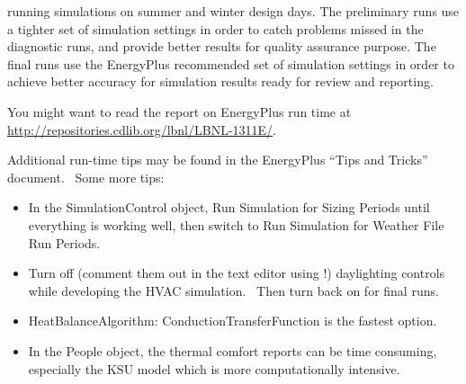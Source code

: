 running simulations on summer and winter design days. The preliminary runs use a tighter set of simulation settings in order to catch problems missed in the diagnostic runs, and provide better results for quality assurance purpose. The final runs use the EnergyPlus recommended set of simulation settings in order to achieve better accuracy for simulation results ready for review and reporting.

You might want to read the report on EnergyPlus run time at \url{http://repositories.cdlib.org/lbnl/LBNL-1311E/}.

Additional run-time tips may be found in the EnergyPlus ``Tips and Tricks'' document.~ Some more tips:

\begin{itemize}
\item
  In the SimulationControl object, Run Simulation for Sizing Periods until everything is working well, then switch to Run Simulation for Weather File Run Periods.
\item
  Turn off (comment them out in the text editor using !) daylighting controls while developing the HVAC simulation.~ Then turn back on for final runs.
\item
  HeatBalanceAlgorithm: ConductionTransferFunction is the fastest option.
\item
  In the People object, the thermal comfort reports can be time consuming, especially the KSU model which is more computationally intensive.
\end{itemize}